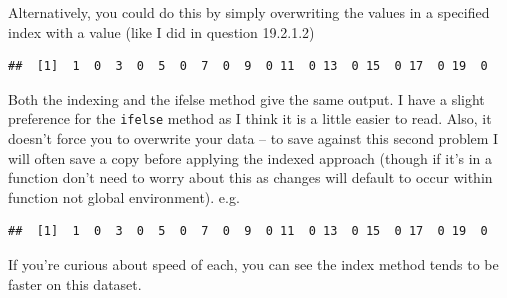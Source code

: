 \documentclass[]{book}
\newenvironment{Shaded}{\begin{snugshade}}{\end{snugshade}}
\newcommand{\DecValTok}[1]{\textcolor[rgb]{0.00,0.00,0.81}{#1}}
\newcommand{\KeywordTok}[1]{\textcolor[rgb]{0.13,0.29,0.53}{\textbf{#1}}}
\newcommand{\NormalTok}[1]{#1}
\newcommand{\OperatorTok}[1]{\textcolor[rgb]{0.81,0.36,0.00}{\textbf{#1}}}
\newcommand{\StringTok}[1]{\textcolor[rgb]{0.31,0.60,0.02}{#1}}
\theoremstyle{definition}
\theoremstyle{definition}
\theoremstyle{definition}
\theoremstyle{remark}
\begin{document}
Alternatively, you could do this by simply overwriting the values in a
specified index with a value (like I did in question 19.2.1.2)

\begin{Shaded}
\end{Shaded}

\begin{verbatim}
##  [1]  1  0  3  0  5  0  7  0  9  0 11  0 13  0 15  0 17  0 19  0
\end{verbatim}

Both the indexing and the ifelse method give the same output. I have a
slight preference for the \texttt{ifelse} method as I think it is a
little easier to read. Also, it doesn't force you to overwrite your data
-- to save against this second problem I will often save a copy before
applying the indexed approach (though if it's in a function don't need
to worry about this as changes will default to occur within function not
global environment). e.g.

\begin{Shaded}
\end{Shaded}

\begin{verbatim}
##  [1]  1  0  3  0  5  0  7  0  9  0 11  0 13  0 15  0 17  0 19  0
\end{verbatim}

If you're curious about speed of each, you can see the index method
tends to be faster on this dataset.
\end{document}
